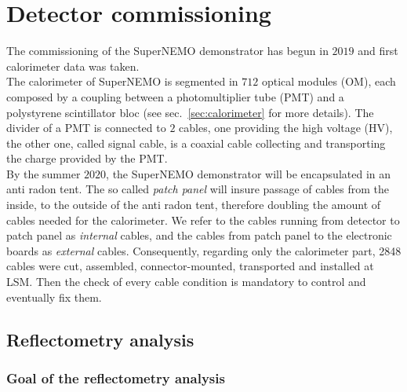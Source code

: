 \chapter{Detector commissioning}
\label{sec:commissioning}

The commissioning of the SuperNEMO demonstrator has begun in $2019$ and first calorimeter data was taken.\\
The calorimeter of SuperNEMO is segmented in $712$ optical modules (OM), each composed by a coupling between a photomultiplier tube (PMT) and a polystyrene scintillator bloc (see sec.~\ref{sec:calorimeter} for more details).
The divider of a PMT is connected to $2$ cables, one providing the high voltage (HV), the other one, called signal cable, is a coaxial cable collecting and transporting the charge provided by the PMT.\\
By the summer $2020$, the SuperNEMO demonstrator will be encapsulated in an anti radon tent.
The so called \emph{patch panel} will insure passage of cables from the inside, to the outside of the anti radon tent, therefore doubling the amount of cables needed for the calorimeter.
We refer to the cables running from detector to patch panel as \emph{internal} cables, and the cables from patch panel to the electronic boards as \emph{external} cables.
Consequently, regarding only the calorimeter part, 2848 cables were cut, assembled, connector-mounted, transported and installed at LSM.
Then the check of every cable condition is mandatory to control and eventually fix them.

\section{Reflectometry analysis}
\label{sec:reflecto}

\subsection{Goal of the reflectometry analysis}

